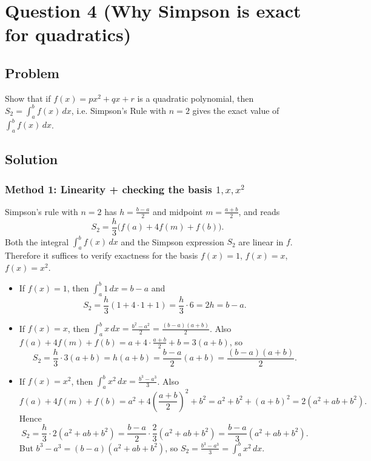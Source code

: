 \documentclass[12pt]{article}
\begin{document}
\newpage


\section*{Question 4 (Why Simpson is exact for quadratics)}

\subsection*{Problem}
Show that if \(f(x)=px^{2}+qx+r\) is a quadratic polynomial, then \(S_{2}=\displaystyle\int_{a}^{b}f(x)\,dx\), i.e. Simpson's Rule with \(n=2\) gives the exact value of \(\displaystyle\int_{a}^{b}f(x)\,dx\).

\subsection*{Solution}

\subsubsection*{Method 1: Linearity + checking the basis \(1,x,x^{2}\)}

Simpson's rule with \(n=2\) has \(h=\frac{b-a}{2}\) and midpoint \(m=\frac{a+b}{2}\), and reads
\[
S_{2}=\frac{h}{3}\big(f(a)+4f(m)+f(b)\big).
\]
Both the integral \(\int_a^b f(x)\,dx\) and the Simpson expression \(S_2\) are linear in \(f\). Therefore it suffices to verify exactness for the basis \(f(x)=1\), \(f(x)=x\), \(f(x)=x^{2}\).

\begin{itemize}[leftmargin=*]
\item If \(f(x)=1\), then \(\int_a^b 1\,dx=b-a\) and
\[
S_2=\frac{h}{3}(1+4\cdot 1+1)=\frac{h}{3}\cdot 6=2h=b-a.
\]

\item If \(f(x)=x\), then \(\int_a^b x\,dx=\frac{b^{2}-a^{2}}{2}=\frac{(b-a)(a+b)}{2}\).
Also \(f(a)+4f(m)+f(b)=a+4\cdot\frac{a+b}{2}+b=3(a+b)\), so
\[
S_2=\frac{h}{3}\cdot 3(a+b)=h(a+b)=\frac{b-a}{2}(a+b)=\frac{(b-a)(a+b)}{2}.
\]

\item If \(f(x)=x^{2}\), then \(\int_a^b x^{2}\,dx=\frac{b^{3}-a^{3}}{3}\).
Also
\[
f(a)+4f(m)+f(b)=a^{2}+4\left(\frac{a+b}{2}\right)^{2}+b^{2}
=a^{2}+b^{2}+(a+b)^{2}=2(a^{2}+ab+b^{2}).
\]
Hence
\[
S_2=\frac{h}{3}\cdot 2(a^{2}+ab+b^{2})
=\frac{b-a}{2}\cdot \frac{2}{3}(a^{2}+ab+b^{2})
=\frac{b-a}{3}(a^{2}+ab+b^{2}).
\]
But \(b^{3}-a^{3}=(b-a)(a^{2}+ab+b^{2})\), so \(S_2=\frac{b^{3}-a^{3}}{3}=\int_a^b x^{2}\,dx\).
\end{itemize}
\end{document}
